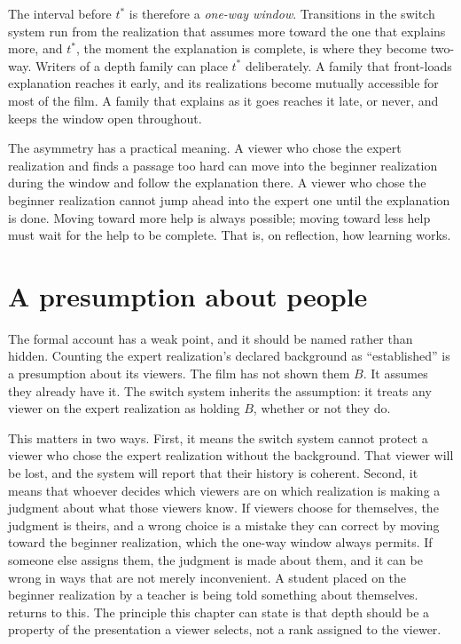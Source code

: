 The interval before $t^{*}$ is therefore a \emph{one-way window}. Transitions in the switch system run from the realization that assumes more toward the one that explains more, and $t^{*}$, the moment the explanation is complete, is where they become two-way. Writers of a depth family can place $t^{*}$ deliberately. A family that front-loads explanation reaches it early, and its realizations become mutually accessible for most of the film. A family that explains as it goes reaches it late, or never, and keeps the window open throughout.

The asymmetry has a practical meaning. A viewer who chose the expert realization and finds a passage too hard can move into the beginner realization during the window and follow the explanation there. A viewer who chose the beginner realization cannot jump ahead into the expert one until the explanation is done. Moving toward more help is always possible; moving toward less help must wait for the help to be complete. That is, on reflection, how learning works.

\section{A presumption about people}

The formal account has a weak point, and it should be named rather than hidden. Counting the expert realization's declared background as ``established'' is a presumption about its viewers. The film has not shown them $B$. It assumes they already have it. The switch system inherits the assumption: it treats any viewer on the expert realization as holding $B$, whether or not they do.

This matters in two ways. First, it means the switch system cannot protect a viewer who chose the expert realization without the background. That viewer will be lost, and the system will report that their history is coherent. Second, it means that whoever decides which viewers are on which realization is making a judgment about what those viewers know. If viewers choose for themselves, the judgment is theirs, and a wrong choice is a mistake they can correct by moving toward the beginner realization, which the one-way window always permits. If someone else assigns them, the judgment is made about them, and it can be wrong in ways that are not merely inconvenient. A student placed on the beginner realization by a teacher is being told something about themselves.  returns to this. The principle this chapter can state is that depth should be a property of the presentation a viewer selects, not a rank assigned to the viewer.

